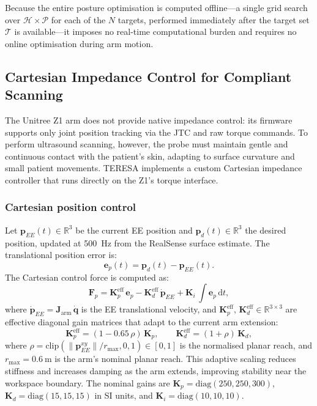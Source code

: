 Because the entire posture optimisation is computed offline---a single grid
search over $\mathcal{H} \times \mathcal{P}$ for each of the $N$ targets,
performed immediately after the target set $\mathcal{T}$ is available---it
imposes no real-time computational burden and requires no online
optimisation during arm motion.

\subsection{Cartesian Impedance Control for Compliant Scanning}

The Unitree Z1 arm does not provide native impedance control: its
firmware supports only joint position tracking via the \ac{JTC} and raw
torque commands. To perform ultrasound scanning, however, the probe must
maintain gentle and continuous contact with the patient's skin, adapting
to surface curvature and small patient movements. \ac{TERESA} implements a
custom Cartesian impedance controller that runs directly on the Z1's
torque interface.

\subsubsection{Cartesian position control}
Let $\mathbf{p}_{EE}(t) \in \mathbb{R}^3$ be the current \ac{EE} position
and $\mathbf{p}_d(t) \in \mathbb{R}^3$ the desired position, updated at
\SI{500}{\hertz} from the RealSense surface estimate. The translational
position error is:
\begin{equation}
  \mathbf{e}_p(t) = \mathbf{p}_d(t) - \mathbf{p}_{EE}(t).
  \label{eq:pos_error}
\end{equation}
The Cartesian control force is computed as:
\begin{equation}
  \mathbf{F}_p =
  \mathbf{K}_p^{\mathrm{eff}}\,\mathbf{e}_p
  - \mathbf{K}_d^{\mathrm{eff}}\,\dot{\mathbf{p}}_{EE}
  + \mathbf{K}_i\,\int \mathbf{e}_p\,\mathrm{d}t,
  \label{eq:cartesian_force}
\end{equation}
where $\dot{\mathbf{p}}_{EE} = \mathbf{J}_{\mathrm{arm}}\,\dot{\mathbf{q}}$
is the \ac{EE} translational velocity, and
$\mathbf{K}_p^{\mathrm{eff}},\,\mathbf{K}_d^{\mathrm{eff}} \in
\mathbb{R}^{3 \times 3}$ are effective diagonal gain matrices that adapt
to the current arm extension:
\begin{equation}
  \mathbf{K}_p^{\mathrm{eff}} = (1 - 0.65\,\rho)\,\mathbf{K}_p,
  \qquad
  \mathbf{K}_d^{\mathrm{eff}} = (1 + \rho)\,\mathbf{K}_d,
  \label{eq:adaptive_gains}
\end{equation}
where $\rho = \mathrm{clip}\!\left(\|\mathbf{p}_{EE}^{xy}\|/r_{\max},
0, 1\right) \in [0,1]$ is the normalised planar reach, and
$r_{\max} = \SI{0.6}{\metre}$ is the arm's nominal planar reach. This
adaptive scaling reduces stiffness and increases damping as the arm
extends, improving stability near the workspace boundary. The nominal
gains are $\mathbf{K}_p = \mathrm{diag}(250, 250, 300)$,
$\mathbf{K}_d = \mathrm{diag}(15, 15, 15)$ in SI units, and
$\mathbf{K}_i = \mathrm{diag}(10, 10, 10)$.

